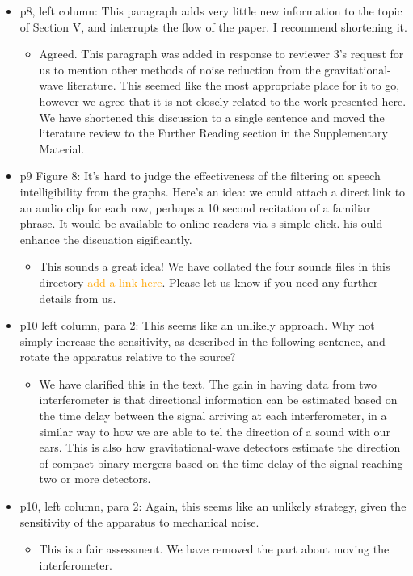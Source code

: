 \documentclass[a4paper, 10pt]{letter}
\begin{document}
\begin{itemize}
\item p8, left column: This paragraph adds very little new information to the topic of Section V, and interrupts the flow of the paper. I recommend shortening it. 
\begin{itemize}
\item Agreed. This paragraph was added in response to reviewer 3's request for us to mention other methods of noise reduction from the gravitational-wave literature. This seemed like the most appropriate place for it to go, however we agree that it is not closely related to the work presented here. We have shortened this discussion to a single sentence and moved the literature review to the Further Reading section in the Supplementary Material. 
\end{itemize}

\item p9 Figure 8: It's hard to judge the effectiveness of the filtering on speech intelligibility from the graphs. Here's an idea: we could attach a direct link to an audio clip for each row, perhaps a 10 second recitation of a familiar phrase. It would be available to online readers via s simple click. his ould enhance the discuation sigificantly.
\begin{itemize}
\item This sounds a great idea! We have collated the four sounds files in this directory \textcolor{orange}{add a link here}. Please let us know if you need any further details from us. 
\end{itemize}


\item p10 left column, para 2: This seems like an unlikely approach. Why not simply increase the sensitivity, as described in the following sentence, and rotate the apparatus relative to the source?
\begin{itemize}
\item We have clarified this in the text. The gain in having data from two interferometer is that directional information can be estimated based on the time delay between the signal arriving at each interferometer, in a similar way to how we are able to tel the direction of a sound with our ears. This is also how gravitational-wave detectors estimate the direction of compact binary mergers based on the time-delay of the signal reaching two or more detectors. 
\end{itemize}

\item p10, left column, para 2: Again, this seems like an unlikely strategy, given the sensitivity of the apparatus to mechanical noise. 
\begin{itemize}
\item This is a fair assessment. We have removed the part about moving the interferometer. 
\end{itemize}


\end{itemize}
\end{document}
